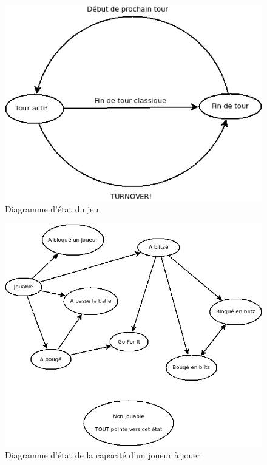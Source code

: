 \documentclass{article}
\begin{document}
    \begin{figure}[H]
        \centerline{\includegraphics[scale=0.5]{img/GameStateGraph.png}}
        \caption{\label{DiaGameStateGraph} Diagramme d'état du jeu}
    \end{figure}
            
    \begin{figure}[H]
        \centerline{\includegraphics[scale=0.4]{img/PlayabilityGraph.png}}
        \caption{\label{DiaPlayabilityGraph} Diagramme d'état de la capacité d'un joueur à jouer}
    \end{figure}
            
\end{document}

